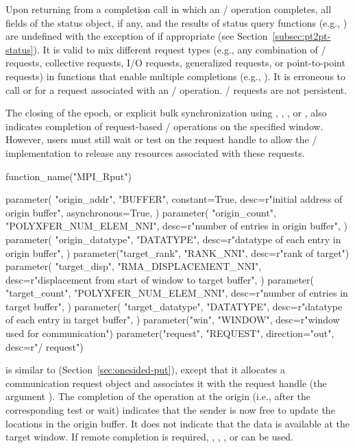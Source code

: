 Upon returning from a completion call in which an \RMA/ operation
completes, all fields of the status object, if any, and the results of status query
functions (e.g., ) are undefined with the
exception of  if appropriate (see
Section~\ref{subsec:pt2pt-status}). It is
valid to mix different request types (e.g., any combination of \RMA/
requests, collective requests, I/O requests, generalized requests, or
point-to-point requests) in functions that enable multiple completions
(e.g., ). It is erroneous to call
 or  for a request
associated with an \RMA/ operation. \RMA/ requests are not persistent.

The closing of the epoch, or explicit bulk synchronization using
, ,
, or
, also indicates completion of
request-based \RMA/ operations on the specified window.
However, users must still wait or test on the request handle to allow
the \MPI/ implementation to release any resources associated with these requests.

%
%
\begin{mpi-binding}
    function_name("MPI_Rput")
    
    parameter(
        "origin_addr",
        "BUFFER",
        constant=True,
        desc=r"initial address of origin buffer",
        asynchronous=True,
    )
    parameter(
        "origin_count",
        "POLYXFER_NUM_ELEM_NNI",
        desc=r"number of entries in origin buffer",
    )
    parameter(
        "origin_datatype",
        "DATATYPE",
        desc=r"datatype of each entry in origin buffer",
    )
    parameter("target_rank", "RANK_NNI", desc=r"rank of target")
    parameter(
        "target_disp",
        "RMA_DISPLACEMENT_NNI",
        desc=r"displacement from start of window to target buffer",
    )
    parameter(
        "target_count",
        "POLYXFER_NUM_ELEM_NNI",
        desc=r"number of entries in target buffer",
    )
    parameter(
        "target_datatype",
        "DATATYPE",
        desc=r"datatype of each entry in target buffer",
    )
    parameter("win", "WINDOW", desc=r"window used for communication")
    parameter("request", "REQUEST", direction="out", desc=r"\RMA/ request")
\end{mpi-binding}

 is similar to 
(Section~\ref{sec:onesided-put}), except that it
allocates a communication request object and associates it with the
request handle (the argument ). The completion of the
operation at the origin (i.e., after the corresponding test or wait) indicates that the sender is now free to
update the locations in the origin buffer. It does not indicate that
the data is available at the target window. If remote completion is
required, , ,
, or
 can be used.

